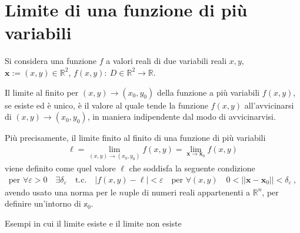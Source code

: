 \documentclass[letterpaper,10pt,english]{jupyterBook}
\begin{document}
\section{Limite di una funzione di più variabili}
\label{\detokenize{ch/multivariable-calculus/limits:limite-di-una-funzione-di-piu-variabili}}\label{\detokenize{ch/multivariable-calculus/limits:multivariable-calculus-limit}}\label{\detokenize{ch/multivariable-calculus/limits::doc}}
\sphinxAtStartPar
Si considera una funzione \(f\) a valori reali di due variabili reali \(x,y\), \(\mathbf{x} := (x,y) \in \mathbb{R}^2\), \(f(x,y): \ D \in \mathbb{R}^2 \rightarrow \mathbb{R}\).

\sphinxAtStartPar
Il limite al finito per \((x,y) \rightarrow (x_0, y_0)\) della funzione a più variabili \(f(x,y)\), se esiste ed è unico, è il valore al quale tende la funzione \(f(x,y)\) all’avvicinarsi di \((x,y) \rightarrow (x_0, y_0)\), in maniera indipendente dal modo di avvicinarvisi.

\sphinxAtStartPar
Più precisamente, il limite finito al finito di una funzione di più variabili
\begin{equation*}
\begin{split}\ell = \lim_{(x,y) \rightarrow (x_0,y_0)} f(x,y) = \lim_{\mathbf{x} \rightarrow \mathbf{x}_0} f(x,y)\end{split}
\end{equation*}
\sphinxAtStartPar
viene definito come quel valore \(\ell\) che soddisfa la seguente condizione
\begin{equation*}
\begin{split}\text{per } \forall \varepsilon > 0 \quad \exists \delta_{\varepsilon} \quad \text{t.c.} \quad |f(x,y) - \ell| < \varepsilon \quad \text{per } \forall (x,y) \quad 0 < || \mathbf{x} - \mathbf{x}_0|| < \delta_\varepsilon \ ,\end{split}
\end{equation*}
\sphinxAtStartPar
avendo usato una norma per le \(n\)\sphinxhyphen{}uple di numeri reali appartenenti a \(\mathbb{R}^n\), per definire un’intorno di \(\mathbb{x}_0\).

\sphinxAtStartPar
{} Esempi in cui il limite esiste e il limite non esiste

\sphinxstepscope
\end{document}
